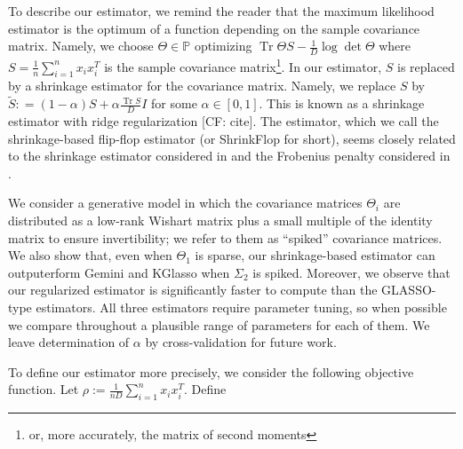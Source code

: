 \documentclass[aos]{imsart}
\theoremstyle{definition}
\numberwithin{equation}{section}
\DeclareMathOperator{\tr}{Tr}
\renewcommand{\P}{{\mathbb{P}}}
\newcommand{\samp}{x}
\newcommand{\CF}[1]{{\color{purple}[CF: #1]}}
\begin{document}
To describe our estimator, we remind the reader that the maximum likelihood estimator is the optimum of a function depending on the sample covariance matrix. Namely, we choose $\Theta \in \P$ optimizing $\tr \Theta S - \frac{1}{D}\log \det \Theta$ where $S = \frac{1}{n} \sum_{i = 1}^n x_i x_i^T$ is the sample covariance matrix\footnote{or, more accurately, the matrix of second moments}. In our estimator, $S$ is replaced by a shrinkage estimator for the covariance matrix. Namely, we replace $S$ by $\tilde{S}: = (1- \alpha) S + \alpha \frac{\tr S}{D} I $ for some $\alpha \in [0,1]$. This is known as a shrinkage estimator with ridge regularization \CF{cite}. The estimator, which we call the shrinkage-based flip-flop estimator (or ShrinkFlop for short), seems closely related to the shrinkage estimator considered in \cite{goes2020robust} and the Frobenius penalty considered in \cite{tang2018integrated}.


We consider a generative model in which the covariance matrices $\Theta_i$ are distributed as a low-rank Wishart matrix plus a small multiple of the identity matrix to ensure invertibility; we refer to them as ``spiked'' covariance matrices. 
We also show that, even when $\Theta_1$ is sparse, our shrinkage-based estimator can outputerform Gemini and KGlasso when $\Sigma_2$ is spiked. 
Moreover, we observe that our regularized estimator is significantly faster to compute than the GLASSO-type estimators. 
All three estimators require parameter tuning, so when possible we compare throughout a plausible range of parameters for each of them. We leave determination of $\alpha$ by cross-validation for future work.

To define our estimator more precisely, we consider the following objective function. Let $\rho:= \frac{1}{nD} \sum_{i = 1}^n \samp_i \samp_i^T$. Define 
\end{document}
